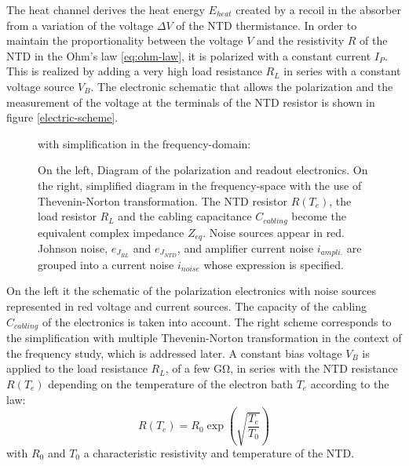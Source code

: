 The heat channel derives the heat energy $E_{heat}$ created by a recoil in the absorber from a variation of the voltage $\Delta V$ of the NTD thermistance. In order to maintain the proportionality between the voltage $V$ and the resistivity $R$ of the NTD in the Ohm's law \ref{eq:ohm-law}, it is polarized with a constant current $I_P$. This is realized by adding a very high load resistance $R_L$ in series with a constant voltage source $V_B$.
The electronic schematic that allows the polarization and the measurement of the voltage at the terminals of the NTD resistor is shown in figure \ref{electric-scheme}.

\begin{figure}
\begin{minipage}[c]{0.45\textwidth}
\resizebox{!}{\textwidth}{%
\begin{circuitikz}[scale=1]
	
\end{circuitikz}
}%
\end{minipage}
\hfill
\vrule{}
\hfill
\begin{minipage}[c]{0.45\textwidth}
\begin{center}
with simplification in the frequency-domain:
\end{center}
\resizebox{\textwidth}{!}{%
\begin{circuitikz}
	
\end{circuitikz}
}%
\end{minipage}
\caption{On the left, Diagram of the polarization and readout electronics. On the right, simplified diagram in the frequency-space with the use of Thevenin-Norton transformation. The NTD resistor $R(T_e)$, the load resistor $R_L$ and the cabling capacitance $C_{cabling}$ become the equivalent complex impedance $Z_{eq}$. Noise sources appear in red. Johnson noise, $e_{J_{RL}}$ and $e_{J_{NTD}}$, and amplifier current noise $i_{ampli.}$ are grouped into a current noise $i_{noise}$ whose expression is specified.}
\label{fig:ethem-electric-scheme}
\end{figure}

On the left it the schematic of the polarization electronics with noise sources represented in red voltage and current sources. The capacity of the cabling $C_{cabling}$ of the electronics is taken into account. The right scheme corresponds to the simplification with multiple Thevenin-Norton transformation
in the context of the frequency study, which is addressed later.
A constant bias voltage $V_B$ is applied to the load resistance $R_L$, of a few \si{\giga\ohm}, in series with the NTD resistance $R(T_e)$ depending on the temperature of the electron bath $T_e$ according to the law:
\begin{equation}
R (T_e) = R_0 \exp \left( \sqrt{ \frac{T_e}{T_0} } \right)
\end{equation}
with $R_0$ and $T_0$ a characteristic resistivity and temperature of the NTD.

